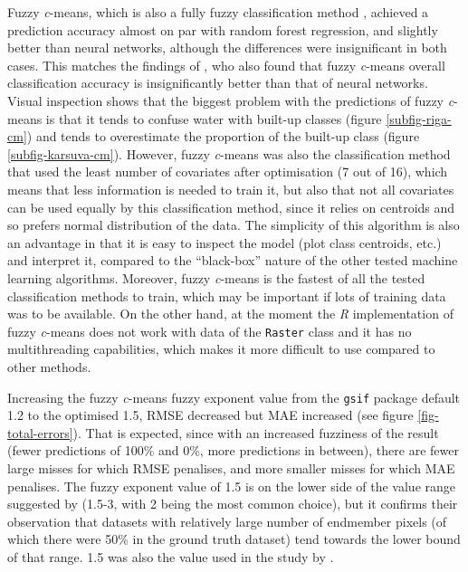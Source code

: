 \documentclass[a4paper,12pt]{scrbook}
\begin{document}
Fuzzy \textit{c}-means, which is also a fully fuzzy classification method \citep{zhang2001fullyfuzzy}, achieved a prediction accuracy almost on par with random forest regression, and slightly better than neural networks, although the differences were insignificant in both cases. This matches the findings of \citet{zhang2001fullyfuzzy}, who also found that fuzzy \textit{c}-means overall classification accuracy is insignificantly better than that of neural networks. Visual inspection shows that the biggest problem with the predictions of fuzzy \textit{c}-means is that it tends to confuse water with built-up classes (figure \ref{subfig-riga-cm}) and tends to overestimate the proportion of the built-up class (figure \ref{subfig-karsuva-cm}). However, fuzzy \textit{c}-means was also the classification method that used the least number of covariates after optimisation (7 out of 16), which means that less information is needed to train it, but also that not all covariates can be used equally by this classification method, since it relies on centroids and so prefers normal distribution of the data. The simplicity of this algorithm is also an advantage in that it is easy to inspect the model (plot class centroids, etc.) and interpret it, compared to the ``black-box'' nature of the other tested machine learning algorithms. Moreover, fuzzy \textit{c}-means is the fastest of all the tested classification methods to train, which may be important if lots of training data was to be available. On the other hand, at the moment the \textit{R} implementation of fuzzy \textit{c}-means does not work with data of the \texttt{Raster} class and it has no multithreading capabilities, which makes it more difficult to use compared to other methods.

Increasing the fuzzy \textit{c}-means fuzzy exponent value from the \texttt{gsif} package default 1.2 to the optimised 1.5, RMSE decreased but MAE increased (see figure \ref{fig-total-errors}). That is expected, since with an increased fuzziness of the result (fewer predictions of 100\% and 0\%, more predictions in between), there are fewer large misses for which RMSE penalises, and more smaller misses for which MAE penalises. The fuzzy exponent value of 1.5 is on the lower side of the value range suggested by \citet{Okeke2006fuzzyexponent} (1.5-3, with 2 being the most common choice), but it confirms their observation that datasets with relatively large number of endmember pixels (of which there were 50\% in the ground truth dataset) tend towards the lower bound of that range. 1.5 was also the value used in the study by \citet{burrough2001fuzzy}.
\end{document}
